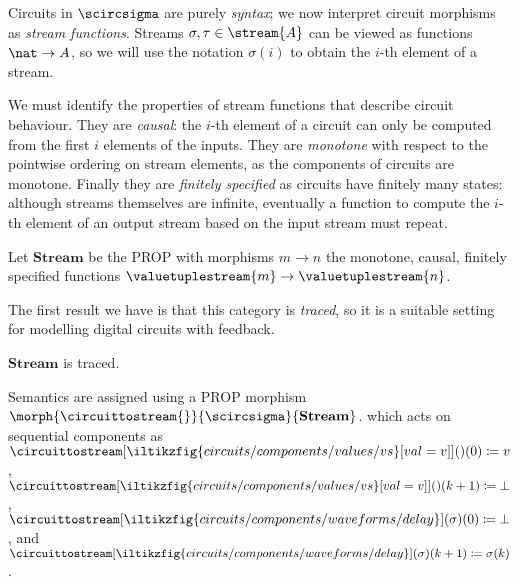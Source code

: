 \documentclass[10pt]{article}
\begin{document}
Circuits in \(\scircsigma\) are purely \emph{syntax}; we now interpret circuit
morphisms as \emph{stream functions}.
Streams \(\sigma,\tau \in \stream{A}\) can be viewed as functions
\(\nat \to A\), so we will use the notation \(\sigma(i)\) to obtain the \(i\)-th
element of a stream.

We must identify the properties of stream functions that describe circuit
behaviour.
They are \emph{causal}: the \(i\)-th element of a circuit can only be computed
from the first \(i\) elements of the inputs.
They are \emph{monotone} with respect to the pointwise ordering on stream
elements, as the components of circuits are monotone.
Finally they are \emph{finitely specified} as circuits have finitely many
states: although streams themselves are infinite, eventually a function to
compute the \(i\)-th element of an output stream based on the input stream must
repeat.

\begin{definition}
    Let \(\mathbf{Stream}\) be the PROP with morphisms \(m \to n\) the monotone,
    causal, finitely specified functions
    \(\valuetuplestream{m} \to \valuetuplestream{n}\).
\end{definition}

The first result we have is that this category is \emph{traced}, so it is a
suitable setting for modelling digital circuits with feedback.

\begin{proposition}
    \(\mathbf{Stream}\) is traced.
\end{proposition}

Semantics are assigned using a PROP morphism
\(\morph{\circuittostream{}}{\scircsigma}{\mathbf{Stream}}\).
which acts on sequential components as \(
\circuittostream[
    \iltikzfig{circuits/components/values/vs}[val=v]
]{}()(0)
\coloneqq
v
\), \(
\circuittostream[
    \iltikzfig{circuits/components/values/vs}[val=v]
]{}()(k+1)
\coloneqq
\bot
\), \(
\circuittostream[
    \iltikzfig{circuits/components/waveforms/delay}
]{}(\sigma)(0)
\coloneqq
\bot
\), and \(
\circuittostream[
    \iltikzfig{circuits/components/waveforms/delay}
]{}(\sigma)(k+1)
\coloneqq
\sigma(k)
\).
\end{document}
